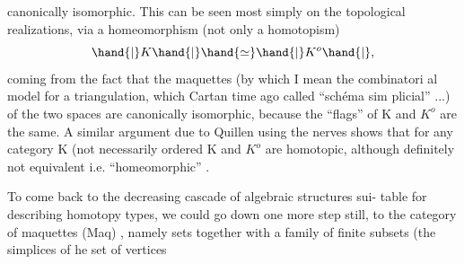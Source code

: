 canonically isomorphic.  This can be seen most simply on the topological
realizations,  via a homeomorphism (not only a homotopism)
\[ \hand{|}K\hand{|} \hand{\simeq} \hand{|}K^{o}\hand{|} , \]
coming from the fact that the maquettes (by which I mean the combinatori%
 al model  for a triangulation,  which Cartan time ago called ``schéma sim%
plicial'' ...) of the two spaces are canonically isomorphic,  because
the ``flags'' of K and $K^{o}$ are the same.  A similar argument due to Quillen
using the nerves shows that for any category K  (not necessarily ordered\unsure{\hand{)}}
K and $K^{o}$ are homotopic,  although definitely not equivalent i.e. 
``homeomorphic'' .

To come back to the decreasing cascade of algebraic structures sui-%
table for describing homotopy types,  we could go down one more step
still,  to the category of  maquettes  (Maq) ,  namely sets together
with a family of finite subsets (the simplices of he set of vertices
